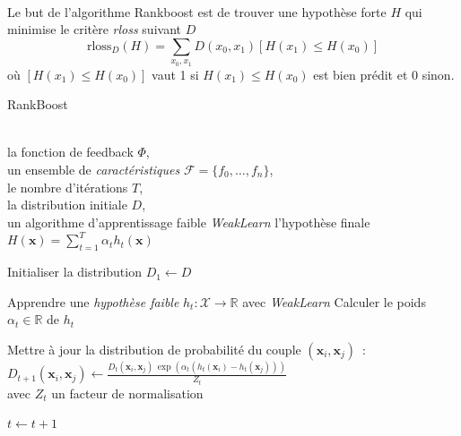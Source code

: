 \documentclass[pdftex,a4paper,11pt]{article}
\newcommand{\vs}[1]{\boldsymbol{#1}} %
\begin{document}
\paragraph{}
Le but de l'algorithme Rankboost est de trouver une hypothèse forte $H$ qui minimise le critère \emph{rloss} suivant $D$
\[
    \text{rloss}_D(H) = \sum_{x_0, x_1} D(x_0, x_1) [H(x_1) \leq H(x_0)]
\]
où $[H(x_1) \leq H(x_0)]$ vaut 1 si $H(x_1) \leq H(x_0)$ est bien prédit et 0 sinon. %

\begin{algorithm}
    \caption{RankBoost}
    \label{alg:rankboost}
    \begin{algorithmic}
        \REQUIRE ~\\
            la fonction de feedback $\Phi$,\\
            un ensemble de \emph{caractéristiques} $\mathcal{F} = \{f_0, \dots, f_n \}$,\\
            le nombre d'itérations $T$,\\
            la distribution initiale $D$,\\
            un algorithme d'apprentissage faible \emph{WeakLearn}
        \ENSURE l'hypothèse finale $H(\vs{x}) = \sum_{t=1}^{T} \alpha_t h_t(\vs{x})$%

        \STATE Initialiser la distribution $D_1 \leftarrow D$ %

            \STATE Apprendre une \emph{hypothèse faible} $h_t : \mathcal{X} \to \mathbb{R}$ avec \emph{WeakLearn}%
            \STATE Calculer le poids $\alpha_t \in \mathbb{R}$ de $h_t$%

                    \STATE Mettre à jour la distribution de probabilité du couple $(\vs{x}_i, \vs{x}_j)$~:\\
                           $D_{t+1}(\vs{x}_i, \vs{x}_j) \leftarrow
                           \frac{ D_t(\vs{x}_i, \vs{x}_j) \, \exp( \alpha_t (h_t(\vs{x}_i) - h_t(\vs{x}_j))) }{ Z_t }$\\
                           avec $Z_t$ un facteur de normalisation
                \ENDFOR
            \ENDFOR

            \STATE $t \leftarrow t + 1$

        \ENDFOR

    \end{algorithmic}
\end{algorithm}
\end{document}
